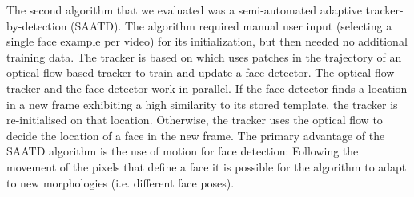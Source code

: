 \documentclass[man,noapacite]{apa2}
\begin{document}
The second algorithm that we evaluated was a semi-automated adaptive tracker-by-detection (SAATD). The algorithm required manual user input (selecting a single face example per video) for its initialization, but then needed no additional training data. The tracker is based on  which uses patches in the trajectory of an optical-flow based tracker \cite{lucas1981} to train and update a face detector. The optical flow tracker and the face detector work in parallel. 
If the face detector finds a location in a new frame exhibiting a high similarity to its stored template, the tracker is re-initialised on that location. Otherwise, the tracker uses the optical flow to decide the location of a face in the new frame.
The primary advantage of the SAATD algorithm is the use of motion for face detection: Following the movement of the pixels that define a face it is possible for the algorithm to adapt to new morphologies (i.e. different face poses). 











\end{document}
